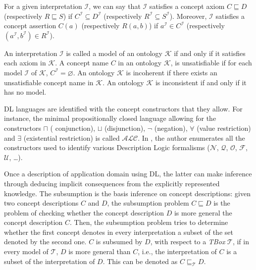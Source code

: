 		For a given interpretation $\mathcal{I} $, we can say that $\mathcal{I} $ satisfies a concept 
		axiom $C \sqsubseteq D$  (respectively $R \sqsubseteq S$) if $C^{\mathcal{I}} \subseteq 
		D^{\mathcal{I}} $ (respectively $R^{\mathcal{I}} \subseteq S^{\mathcal{I}}$). Moreover, 
		$\mathcal{I}$ satisfies a concept assertion $C(a)$ (respectively $R(a,b)$) if 
		$a^{\mathcal{I}} \in C^{\mathcal{I}}$ (respectively $(a^{\mathcal{I}},b^{\mathcal{I}}) 
		\in R^{\mathcal{I}}$).

		An interpretation $\mathcal{I}$ is called a model of an ontology $\mathcal{K}$ if and only 
		if it satisfies each axiom in $\mathcal{K}$. A concept name $C$ in an ontology $\mathcal{K}$, 
		is unsatisfiable if for each model $\mathcal{I}$ of $\mathcal{K}$, $C^{\mathcal{I}} = \varnothing$. 
		An ontology $\mathcal{K}$ is incoherent if there exists an unsatisfiable concept name in $\mathcal{K}$. 
		An ontology $\mathcal{K}$ is inconsistent if and only if it has no model.

		DL languages are identified with the concept constructors that they allow. For instance, the minimal 
		propositionally closed language allowing for the constructors $\sqcap$ ( conjunction), $\sqcup$ 
		(disjunction), $\neg$ (negation), $\forall$ (value restriction) and $\exists$ (existential restriction)
		is called $\mathcal{ALC}$. In \citep{Baader2003}, the author enumerates all the constructors used to 
		identify various Description Logic formalisms ($\mathcal{N}$, $\mathcal{Q}$, $\mathcal{O}$,
		$\mathcal{F}$, $\mathcal{U}$, \dots{}).

		Once a description of application domain using DL, the latter can make inference through 
		deducing implicit consequences from the explicitly represented knowledge. The subsumption is 
		the basis inference on concept descriptions: given two concept descriptions $C$ and $D$, 
		the subsumption problem $C \sqsubseteq D$ is the problem of checking whether the concept description 
		$D$ is more general  the concept description $C$. Then, the subsumption problem tries to determine whether 
		the first concept denotes in every interpretation a subset of the set denoted by the second one. $C$ 
		is subsumed by $D$, with respect to a \emph{TBox} $\mathcal{T}$, if in every model of $\mathcal{T}$, 
		$D$ is more general than $C$, i.e., the interpretation of $C$ is a subset of the interpretation of 
		$D$. This can be denoted as $C \sqsubseteq_{\mathcal{T}} D$.

